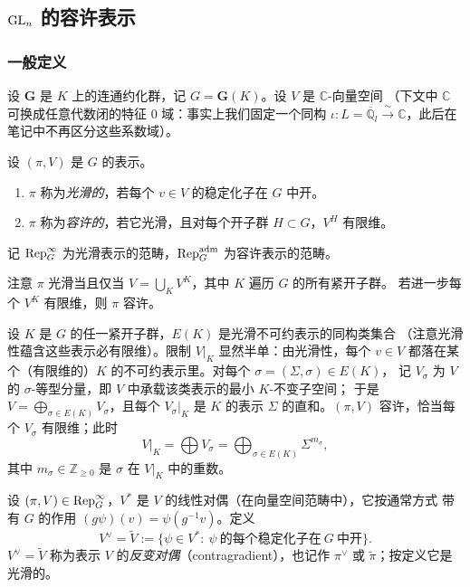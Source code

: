 \subsection{$\mathrm{GL}_n$ 的容许表示}

\subsubsection{一般定义}

设 $\mathbf{G}$ 是 $K$ 上的连通约化群，记 $G=\mathbf{G}(K)$。设 $V$ 是 $\mathbb{C}$-向量空间
（下文中 $\mathbb{C}$ 可换成任意代数闭的特征 $0$ 域：事实上我们固定一个同构
$\iota\colon L=\overline{\mathbb{Q}}_l\xrightarrow{\ \sim\ }\mathbb{C}$，此后在笔记中不再区分这些系数域）。

\begin{definition}
设 $(\pi,V)$ 是 $G$ 的表示。
\begin{enumerate}[label=(\arabic*),leftmargin=2.2em]
\item $\pi$ 称为\emph{光滑的}，若每个 $v\in V$ 的稳定化子在 $G$ 中开。
\item $\pi$ 称为\emph{容许的}，若它光滑，且对每个开子群 $H\subset G$，$V^{H}$ 有限维。
\end{enumerate}
\end{definition}

记 $\mathrm{Rep}^{\infty}_G$ 为光滑表示的范畴，$\mathrm{Rep}^{\mathrm{adm}}_G$ 为容许表示的范畴。

\begin{remark}
注意 $\pi$ 光滑当且仅当 $V=\bigcup_K V^{K}$，其中 $K$ 遍历 $G$ 的所有紧开子群。
若进一步每个 $V^{K}$ 有限维，则 $\pi$ 容许。
\end{remark}

\begin{remark}
设 $K$ 是 $G$ 的任一紧开子群，$E(K)$ 是光滑不可约表示的同构类集合
（注意光滑性蕴含这些表示必有限维）。限制 $V|_K$ 显然半单：由光滑性，每个 $v\in V$
都落在某个（有限维的）$K$ 的不可约表示里。对每个 $\sigma=(\Sigma,\sigma)\in E(K)$，
记 $V_{\sigma}$ 为 $V$ 的 $\sigma$-等型分量，即 $V$ 中承载该类表示的最小 $K$-不变子空间；
于是 $V=\bigoplus_{\sigma\in E(K)}V_{\sigma}$，且每个 $V_{\sigma}|_K$ 是 $K$ 的表示 $\Sigma$
的直和。$(\pi,V)$ 容许，恰当每个 $V_{\sigma}$ 有限维；此时
\[
V|_K=\bigoplus V_{\sigma}=\bigoplus_{\sigma\in E(K)}\Sigma^{m_{\sigma}},
\]
其中 $m_{\sigma}\in\mathbb{Z}_{\ge 0}$ 是 $\sigma$ 在 $V|_K$ 中的重数。
\end{remark}

\begin{definition}
设 $(\pi,V)\in\mathrm{Rep}^{\infty}_G$，$V^{*}$ 是 $V$ 的线性对偶（在向量空间范畴中），它按通常方式
带有 $G$ 的作用 $(g\psi)(v)=\psi(g^{-1}v)$。定义
\[
V^{\vee}=\widetilde{V}:=\{\psi\in V^{*}:\ \psi\ \text{的每个稳定化子在}\ G\ \text{中开}\}.
\]
$V^{\vee}=\widetilde{V}$ 称为表示 $V$ 的\emph{反变对偶}（contragradient），也记作
$\pi^{\vee}$ 或 $\widetilde{\pi}$；按定义它是光滑的。
\end{definition}

